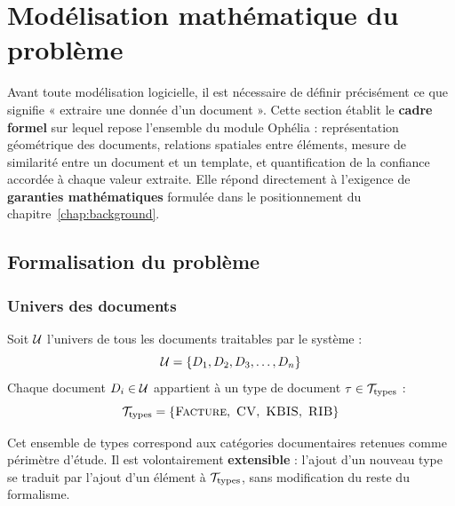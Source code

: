 \vspace{3mm}
\chaptertoc
\newpage

\section{Modélisation mathématique du problème}
\label{sec:modelisation-mathematique}

Avant toute modélisation logicielle, il est nécessaire de définir précisément ce que
signifie « extraire une donnée d'un document ». Cette section établit le \textbf{cadre
formel} sur lequel repose l'ensemble du module Ophélia : représentation géométrique des
documents, relations spatiales entre éléments, mesure de similarité entre un document et un
template, et quantification de la confiance accordée à chaque valeur extraite. Elle répond
directement à l'exigence de \textbf{garanties mathématiques} formulée dans le positionnement
du chapitre~\ref{chap:background}.


\subsection{Formalisation du problème}
\label{subsec:formalisation}

\subsubsection{Univers des documents}

\begin{definition}
\label{def:univers}
Soit $\mathcal{U}$ l'univers de tous les documents traitables par le système :
\begin{equation}
\mathcal{U} = \{D_1, D_2, D_3, \ldots, D_n\}
\end{equation}
Chaque document $D_i \in \mathcal{U}$ appartient à un type de document $\tau \in \mathcal{T}_{\text{types}}$ :
\begin{equation}
\Ttypes = \{\textsc{Facture},\ \textsc{CV},\ \textsc{KBIS},\ \textsc{RIB}\}
\end{equation}
\end{definition}

Cet ensemble de types correspond aux catégories documentaires retenues comme périmètre
d'étude. Il est volontairement \textbf{extensible} : l'ajout d'un nouveau type se traduit
par l'ajout d'un élément à $\mathcal{T}_{\text{types}}$, sans modification du reste du formalisme.

